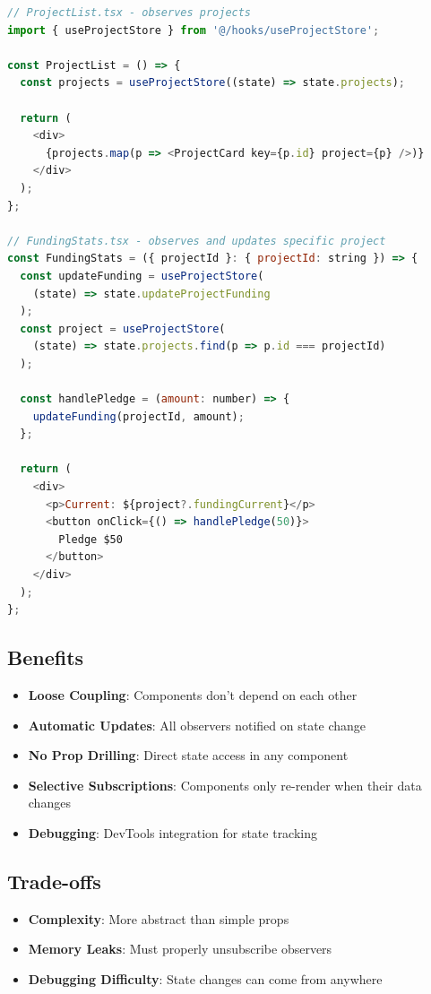 \documentclass[12pt,a4paper]{article}
\begin{document}
\begin{lstlisting}[language=JavaScript, caption=Component usage (Observer)]
// ProjectList.tsx - observes projects
import { useProjectStore } from '@/hooks/useProjectStore';

const ProjectList = () => {
  const projects = useProjectStore((state) => state.projects);
  
  return (
    <div>
      {projects.map(p => <ProjectCard key={p.id} project={p} />)}
    </div>
  );
};

// FundingStats.tsx - observes and updates specific project
const FundingStats = ({ projectId }: { projectId: string }) => {
  const updateFunding = useProjectStore(
    (state) => state.updateProjectFunding
  );
  const project = useProjectStore(
    (state) => state.projects.find(p => p.id === projectId)
  );

  const handlePledge = (amount: number) => {
    updateFunding(projectId, amount);
  };

  return (
    <div>
      <p>Current: ${project?.fundingCurrent}</p>
      <button onClick={() => handlePledge(50)}>
        Pledge $50
      </button>
    </div>
  );
};
\end{lstlisting}

\subsection{Benefits}
\begin{itemize}
    \item \textbf{Loose Coupling}: Components don't depend on each other
    \item \textbf{Automatic Updates}: All observers notified on state change
    \item \textbf{No Prop Drilling}: Direct state access in any component
    \item \textbf{Selective Subscriptions}: Components only re-render when their data changes
    \item \textbf{Debugging}: DevTools integration for state tracking
\end{itemize}

\subsection{Trade-offs}
\begin{itemize}
    \item \textbf{Complexity}: More abstract than simple props
    \item \textbf{Memory Leaks}: Must properly unsubscribe observers
    \item \textbf{Debugging Difficulty}: State changes can come from anywhere
\end{itemize}
\end{document}

